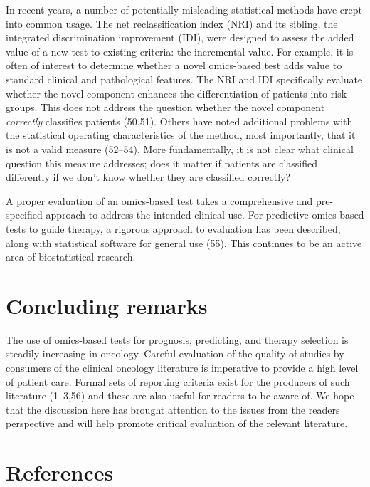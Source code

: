 \documentclass[11pt]{article}
\begin{document}
In recent years, a number of potentially misleading statistical methods
have crept into common usage. The net reclassification index (NRI) and
its sibling, the integrated discrimination improvement (IDI), were
designed to assess the added value of a new test to existing criteria:
the incremental value. For example, it is often of interest to determine
whether a novel omics-based test adds value to standard clinical and
pathological features. The NRI and IDI specifically evaluate whether the
novel component enhances the differentiation of patients into risk
groups. This does not address the question whether the novel component
\emph{correctly} classifies patients (50,51). Others have noted
additional problems with the statistical operating characteristics of
the method, most importantly, that it is not a valid measure (52--54).
More fundamentally, it is not clear what clinical question this measure
addresses; does it matter if patients are classified differently if we
don't know whether they are classified correctly?

A proper evaluation of an omics-based test takes a comprehensive and
pre-specified approach to address the intended clinical use. For
predictive omics-based tests to guide therapy, a rigorous approach to
evaluation has been described, along with statistical software for
general use (55). This continues to be an active area of biostatistical
research.

\section{Concluding remarks}\label{concluding-remarks}

The use of omics-based tests for prognosis, predicting, and therapy
selection is steadily increasing in oncology. Careful evaluation of the
quality of studies by consumers of the clinical oncology literature is
imperative to provide a high level of patient care. Formal sets of
reporting criteria exist for the producers of such literature (1--3,56)
and these are also useful for readers to be aware of. We hope that the
discussion here has brought attention to the issues from the readers
perspective and will help promote critical evaluation of the relevant
literature.

\section{References}\label{references}

\setlength{\parindent}{0pt}
\end{document}
